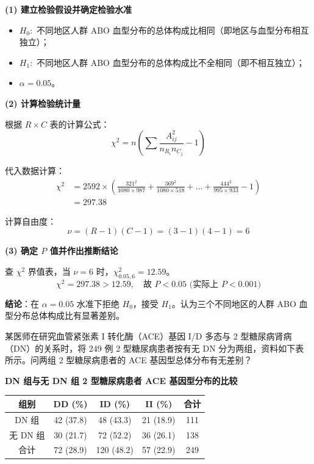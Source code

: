\documentclass[lang=cn,10pt]{elegantbook}
\begin{document}
\begin{solution}
\textbf{(1) 建立检验假设并确定检验水准}
\begin{itemize}
    \item $H_0:$ 不同地区人群 ABO 血型分布的总体构成比相同（即地区与血型分布相互独立）；
    \item $H_1:$ 不同地区人群 ABO 血型分布的总体构成比不全相同（即不相互独立）；
    \item $\alpha = 0.05$。
\end{itemize}

\textbf{(2) 计算检验统计量}

根据 $R \times C$ 表的计算公式：
\[
\chi^2 = n \left( \sum \frac{A_{ij}^2}{n_{R_i} n_{C_j}} - 1 \right)
\]

代入数据计算：
\begin{align*}
\chi^2 &= 2592 \times \left( \frac{321^2}{1080 \times 987} + \frac{369^2}{1080 \times 518} + \dots + \frac{444^2}{995 \times 933} - 1 \right) \\
&= 297.38
\end{align*}

计算自由度：
\[
\nu = (R-1)(C-1) = (3-1)(4-1) = 6
\]

\textbf{(3) 确定 $P$ 值并作出推断结论}

查 $\chi^2$ 界值表，当 $\nu=6$ 时，$\chi^2_{0.05, 6} = 12.59$。
\[
\chi^2 = 297.38 > 12.59, \quad \text{故 } P < 0.05 \text{ (实际上 } P < 0.001 \text{)}
\]

\textbf{结论}：在 $\alpha=0.05$ 水准下拒绝 $H_0$，接受 $H_1$。认为三个不同地区的人群 ABO 血型分布总体构成比有显著差别。
\end{solution}

\vspace{1cm}


\begin{exercise}
某医师在研究血管紧张素 I 转化酶（ACE）基因 I/D 多态与 2 型糖尿病肾病（DN）的关系时，将 249 例 2 型糖尿病患者按有无 DN 分为两组，资料如下表所示。问两组 2 型糖尿病患者的 ACE 基因型总体分布有无差别？

\begin{center}
\textbf{DN 组与无 DN 组 2 型糖尿病患者 ACE 基因型分布的比较}
\medskip

\begin{tabular}{ccccc}
  \toprule
  组别 & DD (\%) & ID (\%) & II (\%) & 合计 \\
  \midrule
  DN 组 & 42 (37.8) & 48 (43.3) & 21 (18.9) & 111 \\
  无 DN 组 & 30 (21.7) & 72 (52.2) & 36 (26.1) & 138 \\
  \midrule
  合计 & 72 (28.9) & 120 (48.2) & 57 (22.9) & 249 \\
  \bottomrule
\end{tabular}
\end{center}
\end{exercise}
\end{document}
